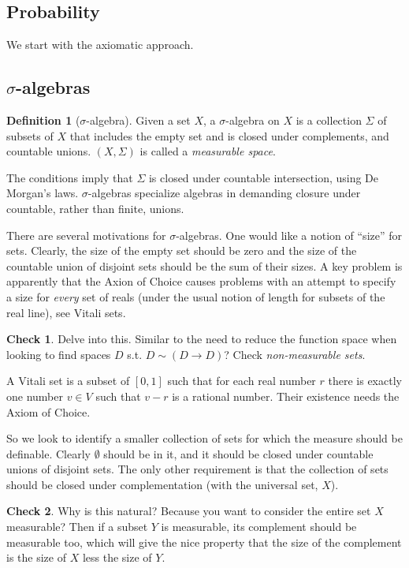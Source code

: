 \documentclass{article}
\theoremstyle{definition}
\newtheorem{definition}{Definition}[section]
\newtheorem*{CHECK}{{\sc Check}}
\begin{document}
\subsection{Probability}

We start with the axiomatic approach.

\subsection{\(\sigma\)-algebras}
\begin{definition}[\(\sigma\)-algebra] Given a set \(X\), a \(\sigma\)-algebra on \(X\) is a collection \(\Sigma\) of subsets of \(X\) that includes the empty set and is closed under complements, and countable unions. \((X,\Sigma)\) is called a {\em measurable space}.
\end{definition}
The conditions imply that \(\Sigma\) is closed under countable intersection, using De Morgan's laws. \(\sigma\)-algebras specialize algebras in demanding closure under countable, rather than finite, unions. 

There are several motivations for \(\sigma\)-algebras. One would like a notion of ``size'' for sets. Clearly, the size of the empty set should be zero and the size of the countable union of disjoint sets should be the sum of their sizes. A key problem is apparently that the Axion of Choice causes problems with an attempt to specify a size for {\em every} set of reals (under the usual notion of length for subsets of the real line), see Vitali sets.

\begin{CHECK}
  Delve into this. Similar to the need to reduce the function space when looking to find spaces \(D\) s.t. \(D \sim (D \rightarrow D)\)? Check {\em non-measurable sets}.

  A Vitali set is a subset of \([0,1]\) such that for each real number \(r\) there is exactly one number \(v\in V\) such that \(v-r\) is a rational number. Their existence needs the Axiom of Choice.
\end{CHECK}

So we look to identify a smaller collection of sets for which the measure should be definable. Clearly \(\emptyset\) should be in it, and it should be closed under countable unions of disjoint sets. The only other requirement is that the collection of sets should be closed under complementation (with the universal set, \(X\)).

\begin{CHECK}
Why is this natural? Because you want to consider the entire set \(X\) measurable? Then if a subset \(Y\) is measurable, its complement should be measurable too, which will give the nice property that the size of the complement is the size of \(X\) less the size of \(Y\).
\end{CHECK}
\end{document}
